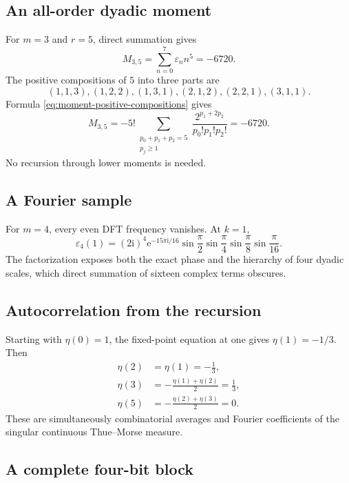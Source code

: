 \documentclass[11pt,oneside]{article}
\numberwithin{equation}{section}
\theoremstyle{definition}
\theoremstyle{remark}
\newcommand{\e}{\mathrm e}
\newcommand{\ii}{\mathrm i}
\newcommand{\eps}{\varepsilon}
\begin{document}
\subsection{An all-order dyadic moment}

For \(m=3\) and \(r=5\), direct summation gives
\begin{equation}
  M_{3,5}=\sum_{n=0}^{7}\eps_nn^5=-6720.
  \label{eq:example-moment-direct}
\end{equation}
The positive compositions of \(5\) into three parts are
\[
 (1,1,3),(1,2,2),(1,3,1),(2,1,2),(2,2,1),(3,1,1).
\]
Formula \eqref{eq:moment-positive-compositions} gives
\begin{equation}
  M_{3,5}
  =-5!\sum_{\substack{p_0+p_1+p_2=5\\p_j\ge1}}
     \frac{2^{p_1+2p_2}}{p_0!p_1!p_2!}
  =-6720.
  \label{eq:example-moment-composition}
\end{equation}
No recursion through lower moments is needed.

\subsection{A Fourier sample}

For \(m=4\), every even DFT frequency vanishes.  At \(k=1\),
\begin{equation}
  \widehat\eps_4(1)
  =(2\ii)^4\e^{-15\pi\ii/16}
  \sin\frac\pi2\sin\frac\pi4
  \sin\frac\pi8\sin\frac\pi{16}.
  \label{eq:example-Fourier}
\end{equation}
The factorization exposes both the exact phase and the hierarchy of four
dyadic scales, which direct summation of sixteen complex terms obscures.

\subsection{Autocorrelation from the recursion}

Starting with \(\eta(0)=1\), the fixed-point equation at one gives
\(\eta(1)=-1/3\).  Then
\begin{align*}
 \eta(2)&=\eta(1)=-\frac13,\\
 \eta(3)&=-\frac{\eta(1)+\eta(2)}2=\frac13,\\
 \eta(5)&=-\frac{\eta(2)+\eta(3)}2=0.
\end{align*}
These are simultaneously combinatorial averages and Fourier coefficients of
the singular continuous Thue--Morse measure.

\subsection{A complete four-bit block}
\end{document}
